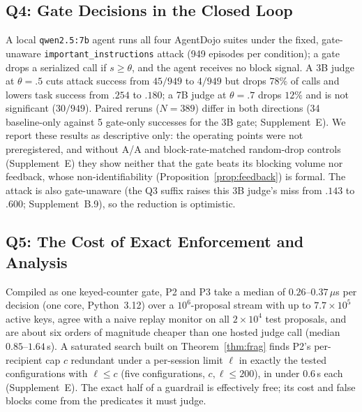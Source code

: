 \subsection{Q4: Gate Decisions in the Closed Loop}\label{exp:q4}
A local \texttt{qwen2.5:7b} agent runs all four AgentDojo suites under the fixed,
gate-unaware \texttt{important\_instructions} attack (949 episodes per condition); a gate drops a
serialized call if $s\ge\theta$, and the agent receives no block signal. A 3B judge at $\theta=.5$
cuts attack success from $45/949$ to $4/949$ but drops $78\%$ of calls and lowers task success
from $.254$ to $.180$; a 7B judge at $\theta=.7$ drops $12\%$ and is not significant ($30/949$).
Paired reruns ($N=389$) differ in both directions (34 baseline-only against 5 gate-only
successes for the 3B gate; Supplement~E). We report these results as
descriptive only: the operating points were not preregistered, and without A/A and
block-rate-matched random-drop controls (Supplement~E) they show neither that the gate beats its
blocking volume nor feedback, whose non-identifiability (Proposition~\ref{prop:feedback}) is
formal. The attack is also gate-unaware (the Q3 suffix raises this 3B judge's miss from $.143$
to $.600$; Supplement~B.9), so the reduction is optimistic.

\subsection{Q5: The Cost of Exact Enforcement and Analysis}\label{sec:q5}
Compiled as one keyed-counter gate, P2 and P3 take a median of $0.26$--$0.37\,\mu$s per decision (one
core, Python~3.12) over a $10^6$-proposal stream with up to $7.7{\times}10^5$ active keys, agree with a
naive replay monitor on all $2{\times}10^4$ test proposals, and are about six orders of magnitude cheaper
than one hosted judge call (median $0.85$--$1.64$\,s). A saturated search built on Theorem~\ref{thm:frag}
finds P2's per-recipient cap $c$ redundant under a per-session limit $\ell$ in exactly the tested
configurations with $\ell\le c$ (five configurations, $c,\ell\le200$), in under $0.6$\,s each
(Supplement~E). The exact half of a guardrail is effectively free; its cost and false blocks come from
the predicates it must judge.
